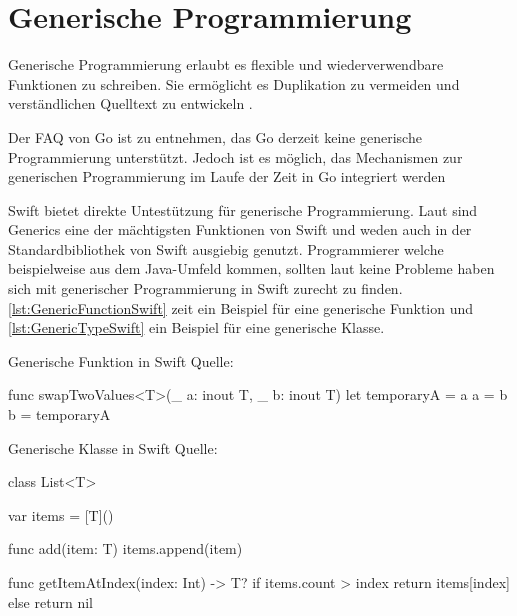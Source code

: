 \chapter{Generische Programmierung}
Generische Programmierung erlaubt es flexible und wiederverwendbare Funktionen zu schreiben. 
Sie ermöglicht es Duplikation zu vermeiden und verständlichen Quelltext zu entwickeln \cite[S.371]{Apple.2017}.


Der FAQ von Go ist zu entnehmen, das Go derzeit keine generische Programmierung unterstützt. 
Jedoch ist es möglich, das Mechanismen zur generischen Programmierung im Laufe der Zeit in Go integriert werden \cite{Golang.FAQ}


Swift bietet direkte Untestützung für generische Programmierung.
Laut \cite[S.371]{Apple.2017} sind Generics eine der mächtigsten Funktionen von Swift und weden auch in der Standardbibliothek von Swift ausgiebig genutzt.
Programmierer welche beispielweise aus dem Java-Umfeld kommen, sollten laut \cite[S.206]{Hoffman.2017} keine Probleme haben sich mit generischer Programmierung in Swift zurecht zu finden.
\autoref{lst:GenericFunctionSwift} zeit ein Beispiel für eine generische Funktion und \autoref{lst:GenericTypeSwift} ein Beispiel für eine generische Klasse.

\begin{listing}
\caption{Generische Funktion in Swift Quelle: \cite[S.373]{Apple.2017}}
\label{lst:GenericFunctionSwift}
\begin{SwiftCode}
func swapTwoValues<T>(_ a: inout T, _ b: inout T) {
    let temporaryA = a
    a = b
    b = temporaryA
}
\end{SwiftCode}
\end{listing}

\begin{listing}
\caption{Generische Klasse in Swift Quelle: \cite[S.213]{Hoffman.2017}}
\label{lst:GenericTypeSwift}
\begin{SwiftCode}
class List<T> {
    var items = [T]()
    
    func add(item: T) {
        items.append(item)
    }
    
    func getItemAtIndex(index: Int) -> T? {
        if items.count > index {
            return items[index]
        } else {
            return nil
        }
    }
}
\end{SwiftCode}
\end{listing}

